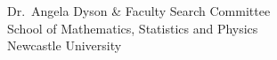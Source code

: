 \documentclass[12pt]{letter}
\begin{document}
\begin{letter}{
        Dr.~Angela Dyson \& Faculty Search Committee \\
        School of Mathematics, Statistics and Physics \\
        Newcastle University}

\end{letter}
\end{document}
